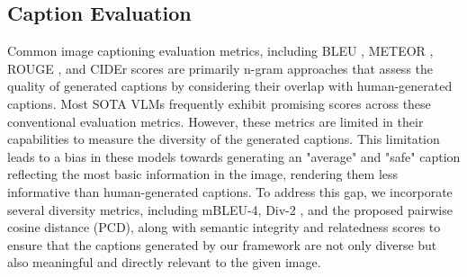 \subsection{Caption Evaluation}\label{rw:eval}
Common image captioning evaluation metrics, including BLEU \cite{bleu}, METEOR \cite{banerjee-lavie-2005-meteor}, ROUGE \cite{lin-2004-rouge}, and CIDEr \cite{cider} scores are primarily n-gram approaches that assess the quality of generated captions by considering their overlap with human-generated captions. Most SOTA VLMs frequently exhibit promising scores across these conventional evaluation metrics. However, these metrics are limited in their capabilities to measure the diversity of the generated captions. This limitation leads to a bias in these models towards generating an "average" and "safe" caption reflecting the most basic information in the image, rendering them less informative than human-generated captions. To address this gap, we incorporate several diversity metrics, including mBLEU-4, Div-2 \cite{aneja2019sequential}, and the proposed pairwise cosine distance (PCD), along with semantic integrity and relatedness scores to ensure that the captions generated by our framework are not only diverse but also meaningful and directly relevant to the given image.


